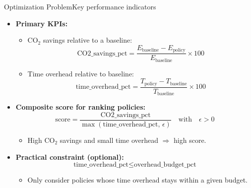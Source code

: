 \begin{frame}[t]{Optimization Problem}{Key performance indicators}

  \begin{itemize}
    \item \textbf{Primary KPIs:}
      \begin{itemize}
        \item CO$_2$ savings relative to a baseline:
          \[
            \text{CO2\_savings\_pct}
            = \frac{E_{\text{baseline}} -
            E_{\text{policy}}}{E_{\text{baseline}}} \times 100
          \]
        \item Time overhead relative to baseline:
          \[
            \text{time\_overhead\_pct}
            = \frac{T_{\text{policy}} -
            T_{\text{baseline}}}{T_{\text{baseline}}} \times 100
          \]
      \end{itemize}

      \vspace{0.2cm}
    \item \textbf{Composite score for ranking policies:}
      \[
        \text{score} =
        \frac{\text{CO2\_savings\_pct}}
        {\max(\text{time\_overhead\_pct}, \,\epsilon)}
        \quad\text{with}\quad \epsilon > 0
      \]
      \begin{itemize}
        \item High CO$_2$ savings and small time overhead
          $\Rightarrow$ high score.
      \end{itemize}

      \vspace{0.2cm}
    \item \textbf{Practical constraint (optional):}
      \[
        \text{time\_overhead\_pct} \leq \text{overhead\_budget\_pct}
      \]
      \begin{itemize}
        \item Only consider policies whose time overhead stays within
          a given budget.
      \end{itemize}
  \end{itemize}

\end{frame}
